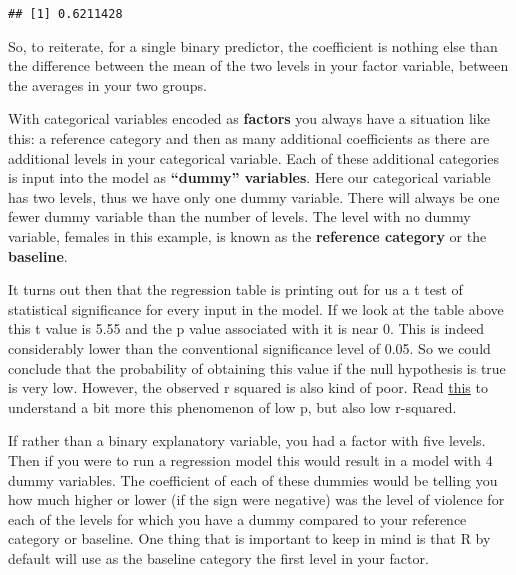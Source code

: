 \documentclass[
]{book}
\newenvironment{Shaded}{\begin{snugshade}}{\end{snugshade}}
\newcommand{\FunctionTok}[1]{\textcolor[rgb]{0.13,0.29,0.53}{\textbf{#1}}}
\newcommand{\NormalTok}[1]{#1}
\newcommand{\SpecialCharTok}[1]{\textcolor[rgb]{0.81,0.36,0.00}{\textbf{#1}}}
\begin{document}
\begin{verbatim}
## [1] 0.6211428
\end{verbatim}

So, to reiterate, for a single binary predictor, the coefficient is nothing else than the difference between the mean of the two levels in your factor variable, between the averages in your two groups.

With categorical variables encoded as \textbf{factors} you always have a situation like this: a reference category and then as many additional coefficients as there are additional levels in your categorical variable. Each of these additional categories is input into the model as \textbf{``dummy'' variables}. Here our categorical variable has two levels, thus we have only one dummy variable. There will always be one fewer dummy variable than the number of levels. The level with no dummy variable, females in this example, is known as the \textbf{reference category} or the \textbf{baseline}.

It turns out then that the regression table is printing out for us a t test of statistical significance for every input in the model. If we look at the table above this t value is 5.55 and the p value associated with it is near 0. This is indeed considerably lower than the conventional significance level of 0.05. So we could conclude that the probability of obtaining this value if the null hypothesis is true is very low. However, the observed r squared is also kind of poor. Read \href{http://blog.minitab.com/blog/adventures-in-statistics/how-to-interpret-a-regression-model-with-low-r-squared-and-low-p-values}{this} to understand a bit more this phenomenon of low p, but also low r-squared.

If rather than a binary explanatory variable, you had a factor with five levels. Then if you were to run a regression model this would result in a model with 4 dummy variables. The coefficient of each of these dummies would be telling you how much higher or lower (if the sign were negative) was the level of violence for each of the levels for which you have a dummy compared to your reference category or baseline. One thing that is important to keep in mind is that R by default will use as the baseline category the first level in your factor.

\begin{Shaded}
\end{Shaded}
\end{document}

